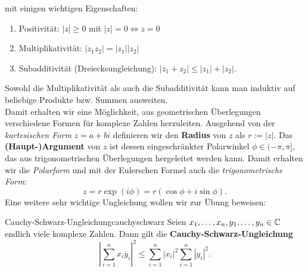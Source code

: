 mit einigen wichtigen Eigenschaften:
\begin{enumerate}[({M}1)]
\item Positivität: $|z| \geq 0$ mit $|z| = 0 \iff z=0$
\item Multiplikativität: $|z_1z_2| = |z_1||z_2|$
\item Subadditivität (Dreiecksungleichung): $|z_1+z_2| \leq |z_1| + |z_2|$.
\end{enumerate}
Sowohl die Multiplikativität als auch die Subadditivität kann man induktiv auf beliebige  Produkte bzw. Summen ausweiten.\\
Damit erhalten wir eine Möglichkeit, aus geometrischen Überlegungen verschiedene Formen für komplexe Zahlen herzuleiten. Ausgehend von der \textit{kartesischen Form} $z=a+bi$ definieren wir den \textbf{Radius} von $z$ als $r := |z|$. Das \textbf{(Haupt-)Argument} von $z$ ist dessen eingeschränkter Polarwinkel $\phi \in (-\pi, \pi]$, das aus trigonometrischen Überlegungen hergeleitet werden kann. Damit erhalten wir die \textit{Polarform} und mit der Eulerschen Formel auch die \textit{trigonometrische Form}:
\begin{equation}
z = r \exp(i\phi) = r(\cos \phi + i \sin \phi).
\end{equation} 
Eine weitere sehr wichtige Ungleichung wollen wir zur Übung beweisen:
\begin{satz}{Cauchy-Schwarz-Ungleichung}{cauchyschwarz}
Seien $x_1, \dots, x_n, y_1, \dots, y_n \in \mathbb{C}$ endlich viele komplexe Zahlen. Dann gilt die \textbf{Cauchy-Schwarz-Ungleichung}
\begin{equation}
\left| \sum_{i=1}^n x_i \overline{y}_i\right|^2 \leq \sum_{i=1}^n |x_i|^2 \sum_{i=1}^n |y_i|^2.
\end{equation}
\end{satz}
